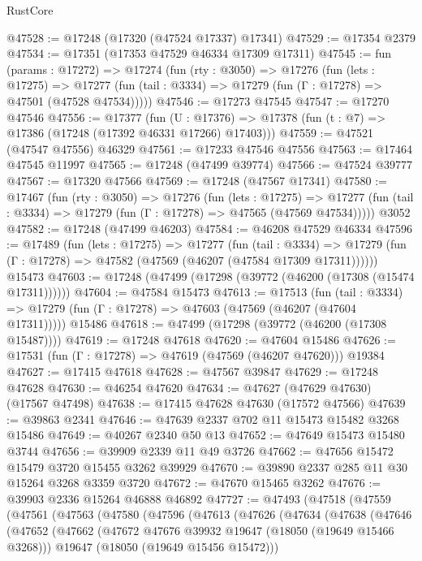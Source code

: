 \begin{lexlean}{RustCore}
\begin{coremodule}
@47528 := @17248 (@17320 (@47524 @17337) @17341)
@47529 := @17354 @2379
@47534 := @17351 (@17353 @47529 @46334 @17309 @17311)
@47545 := fun (params : @17272) =>
  @17274
    (fun (rty : @3050) =>
    @17276
      (fun (lets : @17275) =>
      @17277 (fun (tail : @3334) => @17279 (fun (Γ : @17278) => @47501 (@47528 @47534)))))
@47546 := @17273 @47545
@47547 := @17270 @47546
@47556 := @17377
    (fun (U : @17376) => @17378 (fun (t : @7) => @17386 (@17248 (@17392 @46331 @17266) @17403)))
@47559 := @47521 (@47547 @47556) @46329
@47561 := @17233 @47546 @47556
@47563 := @17464 @47545 @11997
@47565 := @17248 (@47499 @39774)
@47566 := @47524 @39777
@47567 := @17320 @47566
@47569 := @17248 (@47567 @17341)
@47580 := @17467
    (fun (rty : @3050) =>
    @17276
      (fun (lets : @17275) =>
      @17277 (fun (tail : @3334) => @17279 (fun (Γ : @17278) => @47565 (@47569 @47534)))))
    @3052
@47582 := @17248 (@47499 @46203)
@47584 := @46208 @47529 @46334
@47596 := @17489
    (fun (lets : @17275) =>
    @17277
      (fun (tail : @3334) =>
      @17279 (fun (Γ : @17278) => @47582 (@47569 (@46207 (@47584 @17309 @17311))))))
    @15473
@47603 := @17248 (@47499 (@17298 (@39772 (@46200 (@17308 (@15474 @17311))))))
@47604 := @47584 @15473
@47613 := @17513
    (fun (tail : @3334) => @17279 (fun (Γ : @17278) => @47603 (@47569 (@46207 (@47604 @17311)))))
    @15486
@47618 := @47499 (@17298 (@39772 (@46200 (@17308 @15487))))
@47619 := @17248 @47618
@47620 := @47604 @15486
@47626 := @17531 (fun (Γ : @17278) => @47619 (@47569 (@46207 @47620))) @19384
@47627 := @17415 @47618
@47628 := @47567 @39847
@47629 := @17248 @47628
@47630 := @46254 @47620
@47634 := @47627 (@47629 @47630) (@17567 @47498)
@47638 := @17415 @47628 @47630 (@17572 @47566)
@47639 := @39863 @2341
@47646 := @47639 @2337 @702 @11 @15473 @15482 @3268 @15486
@47649 := @40267 @2340 @50 @13
@47652 := @47649 @15473 @15480 @3744
@47656 := @39909 @2339 @11 @49 @3726
@47662 := @47656 @15472 @15479 @3720 @15455 @3262 @39929
@47670 := @39890 @2337 @285 @11 @30 @15264 @3268 @3359 @3720
@47672 := @47670 @15465 @3262
@47676 := @39903 @2336 @15264 @46888 @46892
@47727 := @47493
    (@47518
      (@47559
        (@47561
          (@47563
            (@47580
              (@47596
                (@47613
                  (@47626
                    (@47634
                      (@47638
                        (@47646
                          (@47652
                            (@47662
                              (@47672 @47676 @39932 @19647 (@18050 (@19649 @15466 @3268)))
                              @19647
                              (@18050 (@19649 @15456 @15472)))

\end{coremodule}
\end{lexlean}

